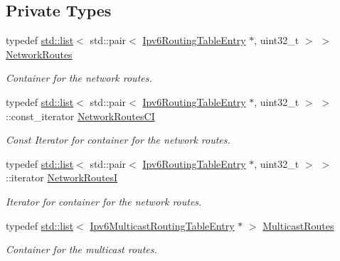 \subsection*{Private Types}
\begin{DoxyCompactItemize}
\item 
typedef \hyperlink{openflow-interface_8h_afd9bcfa176617760671b67580f536fa7}{std\+::list}$<$ std\+::pair$<$ \hyperlink{classns3_1_1Ipv6RoutingTableEntry}{Ipv6\+Routing\+Table\+Entry} $\ast$, uint32\+\_\+t $>$ $>$ \hyperlink{classns3_1_1Ipv6StaticRouting_aa2ac656240490a12d7d3a834a75af7fd}{Network\+Routes}
\begin{DoxyCompactList}\small\item\em Container for the network routes. \end{DoxyCompactList}\item 
typedef \hyperlink{openflow-interface_8h_afd9bcfa176617760671b67580f536fa7}{std\+::list}$<$ std\+::pair$<$ \hyperlink{classns3_1_1Ipv6RoutingTableEntry}{Ipv6\+Routing\+Table\+Entry} $\ast$, uint32\+\_\+t $>$ $>$\+::const\+\_\+iterator \hyperlink{classns3_1_1Ipv6StaticRouting_ad3c559fcd440cfe8e3a127f132c03527}{Network\+Routes\+CI}
\begin{DoxyCompactList}\small\item\em Const Iterator for container for the network routes. \end{DoxyCompactList}\item 
typedef \hyperlink{openflow-interface_8h_afd9bcfa176617760671b67580f536fa7}{std\+::list}$<$ std\+::pair$<$ \hyperlink{classns3_1_1Ipv6RoutingTableEntry}{Ipv6\+Routing\+Table\+Entry} $\ast$, uint32\+\_\+t $>$ $>$\+::iterator \hyperlink{classns3_1_1Ipv6StaticRouting_aaaf6779ff5a716ce508cac3017f5f769}{Network\+RoutesI}
\begin{DoxyCompactList}\small\item\em Iterator for container for the network routes. \end{DoxyCompactList}\item 
typedef \hyperlink{openflow-interface_8h_afd9bcfa176617760671b67580f536fa7}{std\+::list}$<$ \hyperlink{classns3_1_1Ipv6MulticastRoutingTableEntry}{Ipv6\+Multicast\+Routing\+Table\+Entry} $\ast$ $>$ \hyperlink{classns3_1_1Ipv6StaticRouting_a02421205cb9361483594fb8bd2286b12}{Multicast\+Routes}
\begin{DoxyCompactList}\small\item\em Container for the multicast routes. \end{DoxyCompactList}\item 

\end{DoxyCompactItemize}
